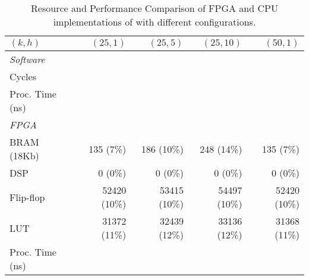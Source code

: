 \begin{table}
\begin{center}
\small
\begin{tabular}{ l r r r r } 
\toprule
$(k, h)$ & $(25, 1)$ & $(25, 5)$ & $(25,10)$ & $(50, 1)$ \\
\midrule
\emph{Software} & & & & \\
\cmidrule{1-1}
Cycles & & & & \\
Proc. Time (ns) & & & & \\
\midrule
\emph{FPGA} & & & & \\
\cmidrule{1-1}
BRAM (18Kb) & 135 (7\%) & 186 (10\%) & 248 (14\%) & 135 (7\%) \\
DSP & 0 (0\%) & 0 (0\%) & 0 (0\%) & 0 (0\%) \\
Flip-flop & 52420 (10\%) & 53415 (10\%) & 54497 (10\%) & 52420 (10\%) \\
LUT & 31372 (11\%) & 32439 (12\%) & 33136 (12\%) & 31368 (11\%) \\
Proc. Time (ns) & & & & \\
\bottomrule
\end{tabular}
\caption{Resource and Performance Comparison of FPGA and CPU implementations of \OurSys with different configurations.}
\label{tab:microbenchmarks}
\end{center}
\end{table}

